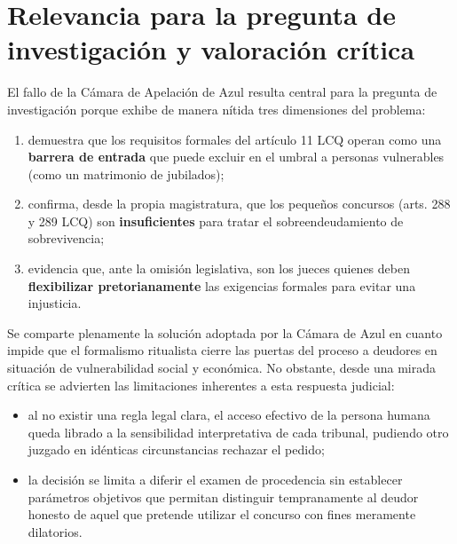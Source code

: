 \documentclass[12pt,oneside]{book}
\begin{document}
\section{Relevancia para la pregunta de investigación y valoración crítica}

El fallo de la Cámara de Apelación de Azul resulta central para la pregunta de investigación porque exhibe de manera nítida tres dimensiones del problema:

\begin{enumerate}
    \item demuestra que los requisitos formales del artículo 11 LCQ operan como una \textbf{barrera de entrada} que puede excluir en el umbral a personas vulnerables (como un matrimonio de jubilados);
    \item confirma, desde la propia magistratura, que los pequeños concursos (arts. 288 y 289 LCQ) son \textbf{insuficientes} para tratar el sobreendeudamiento de sobrevivencia;
    \item evidencia que, ante la omisión legislativa, son los jueces quienes deben \textbf{flexibilizar pretorianamente} las exigencias formales para evitar una injusticia.
\end{enumerate}

Se comparte plenamente la solución adoptada por la Cámara de Azul en cuanto impide que el formalismo ritualista cierre las puertas del proceso a deudores en situación de vulnerabilidad social y económica. No obstante, desde una mirada crítica se advierten las limitaciones inherentes a esta respuesta judicial:

\begin{itemize}
    \item al no existir una regla legal clara, el acceso efectivo de la persona humana queda librado a la sensibilidad interpretativa de cada tribunal, pudiendo otro juzgado en idénticas circunstancias rechazar el pedido;
    \item la decisión se limita a diferir el examen de procedencia sin establecer parámetros objetivos que permitan distinguir tempranamente al deudor honesto de aquel que pretende utilizar el concurso con fines meramente dilatorios.
\end{itemize}
\end{document}
